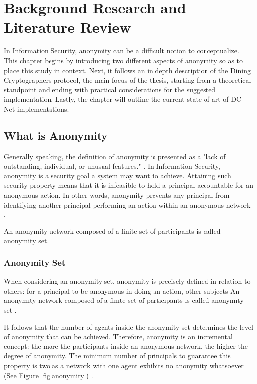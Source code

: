 \chapter{Background Research and Literature Review}

In Information Security, anonymity can be a difficult notion to conceptualize. This chapter begins by introducing two different aspects of anonymity so as to place this study in context. Next, it follows an in depth description of the Dining Cryptographers protocol, the main focus of the thesis, starting from a theoretical standpoint and ending with practical considerations for the suggested implementation. Lastly, the chapter will outline the current state of art of DC-Net implementations.

\section{What is Anonymity}
Generally speaking, the definition of anonymity is presented as a "lack of outstanding, individual, or unusual features." \cite{Anonymity}. In Information Security, anonymity is a security goal a system may want to achieve. Attaining such security property means that it is infeasible to hold a principal accountable for an anonymous action. In other words, anonymity prevents any principal from identifying another principal performing an action within an anonymous network \cite{Malkhi}.

An anonymity network composed of a finite set of participants is called anonymity set.

\subsection{Anonymity Set} \label{sec:anonymityset}
When considering an anonymity set, anonymity is precisely defined in relation to others: for a principal to be anonymous in doing an action, other subjects An anonymity network composed of a finite set of participants is called anonymity set \cite{Pfitzmann}.

It follows that the number of agents inside the anonymity set determines the level of anonymity that can be achieved. Therefore, anonymity is an incremental concept: the more the participants inside an anonymous network, the higher the degree of anonymity. The minimum number of principals to guarantee this property is two,as a network with one agent exhibits no anonymity whatsoever (See Figure \ref{fig:anonymity}) \cite{Franck}.

